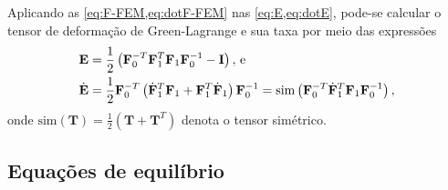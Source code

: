 \documentclass[Tese.tex]{subfiles}
\begin{document}
Aplicando as \cref{eq:F-FEM,eq:dotF-FEM} nas \cref{eq:E,eq:dotE}, pode-se calcular o tensor de deformação de Green-Lagrange e sua taxa por meio das expressões
\begin{align}
&\mathbf{E} = \dfrac{1}{2}\left(\mathbf{F}_0^{-T}\mathbf{F}_1^T\mathbf{F}_1\mathbf{F}_0^{-1}-\mathbf{I}\right), \text{\,e} \label{eq:E-FEM}\\
&\dot{\mathbf{E}} = \dfrac{1}{2}\mathbf{F}_0^{-T}\left(\dot{\mathbf{F}}_1^T\mathbf{F}_1+\mathbf{F}_1^T\dot{\mathbf{F}}_1\right)\mathbf{F}_0^{-1} = \text{sim}\left(\mathbf{F}_0^{-T}\dot{\mathbf{F}}_1^T\mathbf{F}_1\mathbf{F}_0^{-1}\right), \label{eq:dotE-FEM}
\end{align}
onde $\text{sim}(\mathbf{T}) = \frac{1}{2}\left(\mathbf{T}+\mathbf{T}^T\right)$ denota o tensor simétrico.

\subsection{Equações de equilíbrio}
\end{document}
